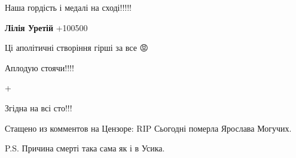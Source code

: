 \begin{itemize}
Наша гордість і медалі на сході!!!!!

\begin{itemize}
 
\textbf{Лілія Уретій} +100500💙💛💙💛💙💛
\end{itemize}

 
Ці аполітичні створіння гірші за все 😡

 
Аплодую стоячи!!!!

 
+

 
Згідна на всі сто!!!

 

Стащено из комментов на Цензоре: RIP Сьогодні померла Ярослава Могучих.

P.S. Причина смерті така сама як і в Усика.

\begin{itemize}
 

\end{itemize}
\end{itemize}
